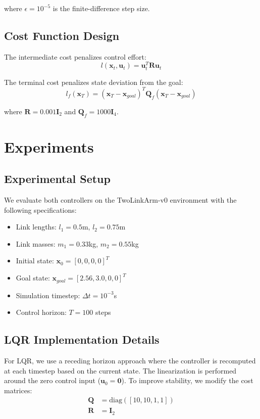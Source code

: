 \documentclass[conference]{IEEEtran}
\begin{document}
where $\epsilon = 10^{-5}$ is the finite-difference step size.

\subsection{Cost Function Design}

The intermediate cost penalizes control effort:
\begin{equation}
l(\mathbf{x}_t, \mathbf{u}_t) = \mathbf{u}_t^T\mathbf{R}\mathbf{u}_t
\end{equation}

The terminal cost penalizes state deviation from the goal:
\begin{equation}
l_f(\mathbf{x}_T) = (\mathbf{x}_T - \mathbf{x}_{goal})^T\mathbf{Q}_f(\mathbf{x}_T - \mathbf{x}_{goal})
\end{equation}

where $\mathbf{R} = 0.001\mathbf{I}_2$ and $\mathbf{Q}_f = 1000\mathbf{I}_4$.

\section{Experiments}

\subsection{Experimental Setup}

We evaluate both controllers on the TwoLinkArm-v0 environment with the following specifications:
\begin{itemize}
\item Link lengths: $l_1 = 0.5$m, $l_2 = 0.75$m
\item Link masses: $m_1 = 0.33$kg, $m_2 = 0.55$kg
\item Initial state: $\mathbf{x}_0 = [0, 0, 0, 0]^T$
\item Goal state: $\mathbf{x}_{goal} = [2.56, 3.0, 0, 0]^T$
\item Simulation timestep: $\Delta t = 10^{-3}$s
\item Control horizon: $T = 100$ steps
\end{itemize}

\subsection{LQR Implementation Details}

For LQR, we use a receding horizon approach where the controller is recomputed at each timestep based on the current state. The linearization is performed around the zero control input ($\mathbf{u}_0 = \mathbf{0}$). To improve stability, we modify the cost matrices:
\begin{align}
\mathbf{Q} &= \text{diag}([10, 10, 1, 1]) \\
\mathbf{R} &= \mathbf{I}_2
\end{align}
\end{document}
